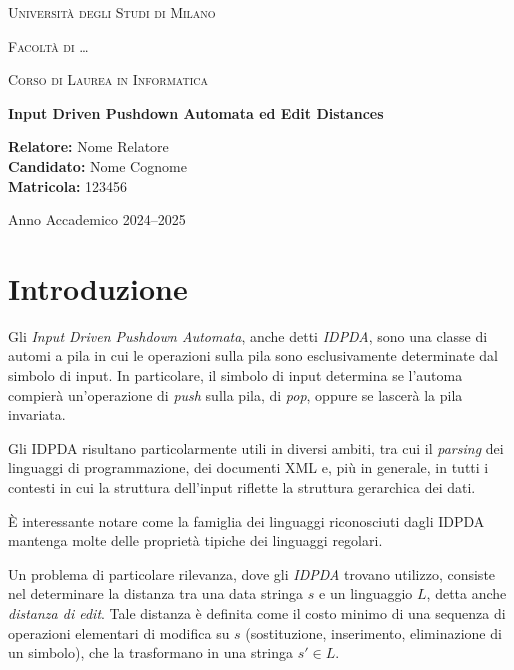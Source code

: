 \documentclass[a4paper,12pt]{report}
\begin{document}
    \begin{titlepage}
        \centering
        {\scshape\LARGE Università degli Studi di Milano \par}
        \vspace{1cm}
        {\scshape\Large Facoltà di \ldots\par}
        \vspace{0.5cm}
        {\scshape\large Corso di Laurea in Informatica\par}
        \vspace{2cm}
        {\huge\bfseries Input Driven Pushdown Automata ed Edit Distances\par}
        \vspace{2cm}
        \begin{flushleft}
            \textbf{Relatore:} Nome Relatore\\
            \textbf{Candidato:} Nome Cognome\\
            \textbf{Matricola:} 123456
        \end{flushleft}
        \vfill
        {\large Anno Accademico 2024--2025\par}
    \end{titlepage}

    \tableofcontents
    \clearpage


    \chapter{Introduzione}

    Gli \emph{Input Driven Pushdown Automata}, anche detti \textit{IDPDA}, sono una classe di automi a pila in cui le operazioni sulla pila sono esclusivamente determinate dal simbolo di input. In particolare, il simbolo di input determina se l'automa compierà un'operazione di \emph{push} sulla pila, di \emph{pop}, oppure se lascerà la pila invariata.

    Gli IDPDA risultano particolarmente utili in diversi ambiti, tra cui il \emph{parsing} dei linguaggi di programmazione, dei documenti XML e, più in generale, in tutti i contesti in cui la struttura dell'input riflette la struttura gerarchica dei dati.

    È interessante notare come la famiglia dei linguaggi riconosciuti dagli IDPDA mantenga molte delle proprietà tipiche dei linguaggi regolari.

    Un problema di particolare rilevanza, dove gli \textit{IDPDA} trovano utilizzo, consiste nel determinare la distanza tra una data stringa $s$ e un linguaggio $L$, detta anche \textit{distanza di edit}. Tale distanza è definita come il costo minimo di una sequenza di operazioni elementari di modifica su $s$ (sostituzione, inserimento, eliminazione di un simbolo), che la trasformano in una stringa $s' \in L$.
\end{document}
